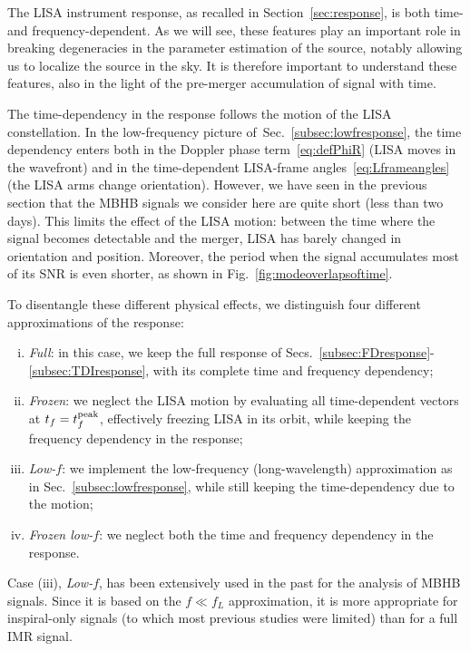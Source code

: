 \documentclass[aps,showpacs,twocolumn,prd,superscriptaddress,nofootinbib]{revtex4-1}
\newcommand{\tf}{t_{f}}
\begin{document}
The LISA instrument response, as recalled in Section~\ref{sec:response}, is both time- and frequency-dependent.
As we will see, these features play an important role in breaking degeneracies in the parameter estimation of the source, notably allowing us to localize the source in the sky. It is therefore important to understand these features, also in the light of the pre-merger accumulation of signal with time.

The time-dependency in the response follows the motion of the LISA constellation. In the low-frequency picture of~Sec.~\ref{subsec:lowfresponse}, the time dependency enters both in the Doppler phase term~\eqref{eq:defPhiR} (LISA moves in the wavefront) and in the time-dependent LISA-frame angles~\eqref{eq:Lframeangles} (the LISA arms change orientation). However, we have seen in the previous section that the MBHB signals we consider here are quite short (less than two days). This limits the effect of the LISA motion: between the time where the signal becomes detectable and the merger, LISA has barely changed in orientation and position. Moreover, the period when the signal accumulates most of its SNR is even shorter, as shown in Fig.~\ref{fig:modeoverlapsoftime}.

To disentangle these different physical effects, we distinguish four different approximations of the response:
\begin{enumerate}[(i)]
	\item \textit{Full}: in this case, we keep the full response of Secs.~\ref{subsec:FDresponse}-\ref{subsec:TDIresponse}, with its complete time and frequency dependency;
	\item \textit{Frozen}: we neglect the LISA motion by evaluating all time-dependent vectors at $\tf = t_{f}^{\rm peak}$, effectively freezing LISA in its orbit, while keeping the frequency dependency in the response;
	\item \textit{Low-$f$}: we implement the low-frequency (long-wavelength) approximation as in Sec.~\ref{subsec:lowfresponse}, while still keeping the time-dependency due to the motion;
	\item \textit{Frozen low-$f$}: we neglect both the time and frequency dependency in the response.
\end{enumerate}

Case (iii), \textit{Low-$f$}, has been extensively used in the past for the analysis of MBHB signals.
Since it is based on the $f \ll f_{L}$ approximation, it is more appropriate for inspiral-only signals (to which most previous studies were limited) than for a full IMR signal.
\end{document}
